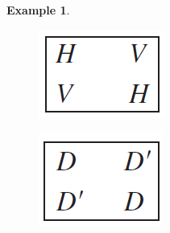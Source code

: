 \documentclass{article}
\theoremstyle{definition}
\newtheorem{example}{Example}[section]
\begin{document}
\begin{example}
        \begin{figure}[!htbp]
            \centering
            \includegraphics[width=0.2\linewidth]{figures/box1.png}
            \caption{}
            \label{box1}
        \end{figure}
        
        \begin{figure}[!htbp]
            \centering
            \includegraphics[width=0.2\linewidth]{figures/box2.png}
            \caption{}
            \label{box2}
        \end{figure}
     \end{example}
     
\end{document}
